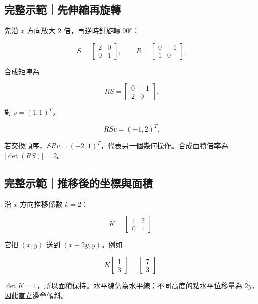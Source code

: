 \documentclass[11pt,a4paper]{article}
\begin{document}
\begin{HandoutWorkedExample}

\subsection{完整示範｜先伸縮再旋轉}\label{ux5b8cux6574ux793aux7bc4ux5148ux4f38ux7e2eux518dux65cbux8f49}

先沿 \(x\) 方向放大 \(2\) 倍，再逆時針旋轉 \(90^\circ\)：

\[
S=\begin{bmatrix}2&0\\0&1\end{bmatrix},
\qquad
R=\begin{bmatrix}0&-1\\1&0\end{bmatrix}.
\]

合成矩陣為

\[
RS=
\begin{bmatrix}0&-1\\2&0\end{bmatrix}.
\]

對 \(v=(1,1)^T\)，

\[
RSv=\boxed{(-1,2)^T}.
\]

若交換順序，\(SRv=(-2,1)^T\)，代表另一個幾何操作。合成面積倍率為 \(|\det(RS)|=2\)。

\end{HandoutWorkedExample}

\begin{HandoutWorkedExample}

\subsection{完整示範｜推移後的坐標與面積}\label{ux5b8cux6574ux793aux7bc4ux63a8ux79fbux5f8cux7684ux5750ux6a19ux8207ux9762ux7a4d}

沿 \(x\) 方向推移係數 \(k=2\)：

\[
K=\begin{bmatrix}1&2\\0&1\end{bmatrix}.
\]

它把 \((x,y)\) 送到 \((x+2y,y)\)。例如

\[
K\begin{bmatrix}1\\3\end{bmatrix}
=\boxed{\begin{bmatrix}7\\3\end{bmatrix}}.
\]

\(\det K=1\)，所以面積保持。水平線仍為水平線；不同高度的點水平位移量為 \(2y\)，因此直立邊會傾斜。

\end{HandoutWorkedExample}
\end{document}
